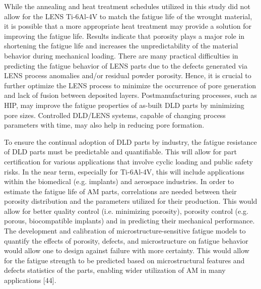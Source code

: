 \documentclass[10pt]{article}
\begin{document}
While the annealing and heat treatment schedules utilized in this study did not allow for the LENS Ti-6Al-4V to match the fatigue life of the wrought material, it is possible that a more appropriate heat treatment may provide a solution for improving the fatigue life. Results indicate that porosity plays a major role in shortening the fatigue life and increases the unpredictability of the material behavior during mechanical loading. There are many practical difficulties in predicting the fatigue behavior of LENS parts due to the defects generated via LENS process anomalies and/or residual powder porosity. Hence, it is crucial to further optimize the LENS process to minimize the occurrence of pore generation and lack of fusion between deposited layers. Postmanufacturing processes, such as HIP, may improve the fatigue properties of as-built DLD parts by minimizing pore sizes. Controlled DLD/LENS systems, capable of changing process parameters with time, may also help in reducing pore formation.

To ensure the continual adoption of DLD parts by industry, the fatigue resistance of DLD parts must be predictable and quantifiable. This will allow for part certification for various applications that involve cyclic loading and public safety risks. In the near term, especially for Ti-6Al-4V, this will include applications within the biomedical (e.g. implants) and aerospace industries. In order to estimate the fatigue life of AM parts, correlations are needed between their porosity distribution and the parameters utilized for their production. This would allow for better quality control (i.e. minimizing porosity), porosity control (e.g. porous, biocompatible implants) and in predicting their mechanical performance. The development and calibration of microstructure-sensitive fatigue models to quantify the effects of porosity, defects, and microstructure on fatigue behavior would allow one to design against failure with more certainty. This would allow for the fatigue strength to be predicted based on microstructural features and defects statistics of the parts, enabling wider utilization of AM in many applications [44].
\end{document}
